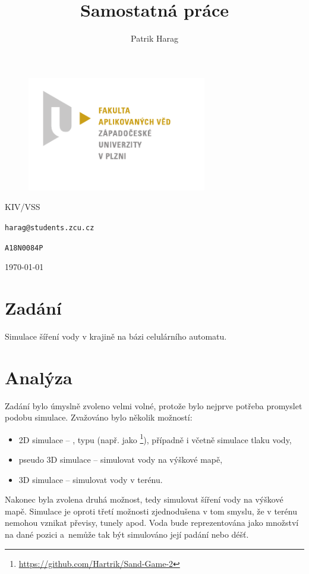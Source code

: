 \documentclass[12pt, a4paper]{article}
\title{Samostatná práce}
\author{Patrik Harag}
\makeatletter
\def \thesubtitle {KIV/VSS}
\def \theauthoremail {harag@students.zcu.cz}
\def \theauthorid {A18N0084P}
\makeatother
\begin{document}
\begin{titlepage}
	\begin{figure}
		\includegraphics[height=50mm]{img-fav-logo}
	\end{figure}
	
	\centering
	{\large \hspace{1mm} \par} %
	\vspace{15ex}
	
	{\huge\bfseries \thetitle \par}
	\vspace{2ex}
	{\scshape\Large \thesubtitle \par}
	\vspace{15ex}
	{\Large\itshape \theauthor \par}
	\vspace{2ex}
	{\texttt{\theauthoremail} \par}
	\vspace{1ex}
	{\texttt{\theauthorid} \par}
	
	\vfill

	{\today\par}
\end{titlepage}


\section*{Zadání}
Simulace šíření vody v krajině na bázi celulárního automatu.


\section*{Analýza}
Zadání bylo úmyslně zvoleno velmi volné, protože bylo nejprve potřeba promyslet podobu simulace.
Zvažováno bylo několik možností:
\begin{itemize}
	\item 2D simulace -- , typu  (např. jako \footnote{\url{https://github.com/Hartrik/Sand-Game-2}}), případně i včetně simulace tlaku vody,
	\item pseudo 3D simulace -- simulovat  vody na výškové mapě,
	\item 3D simulace -- simulovat  vody v  terénu.
\end{itemize}
Nakonec byla zvolena druhá možnost, tedy simulovat šíření vody na výškové mapě.
Simulace je oproti třetí možnosti zjednodušena v tom smyslu, že v terénu nemohou vznikat převisy, tunely apod.
Voda bude reprezentována jako množství na dané pozici a~nemůže tak být simulováno její padání nebo déšť.
\end{document}
